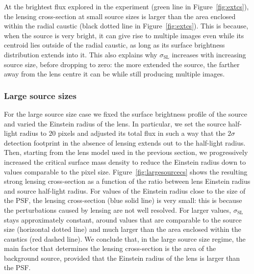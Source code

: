 \documentclass{aa}
\def\crosssect{\sigma_\mathrm{{SL}}}
\def\Fref#1{Figure~\ref{#1}\xspace}
\begin{document}
At the brightest flux explored in the experiment (green line in \Fref{fig:extcs}), the lensing cross-section at small source sizes is larger than the area enclosed within the radial caustic (black dotted line in \Fref{fig:extcs}).
This is because, when the source is very bright, it can give rise to multiple images even while its centroid lies outside of the radial caustic, as long as its surface brightness distribution extends into it.
This also explains why $\crosssect$ increases with increasing source size, before dropping to zero: the more extended the source, the farther away from the lens centre it can be while still producing multiple images.

\subsubsection{Large source sizes}

For the large source size case we fixed the surface brightness profile of the source and varied the Einstein radius of the lens.
In particular, we set the source half-light radius to $20$ pixels and adjusted its total flux in such a way that the $2\sigma$ detection footprint in the absence of lensing extends out to the half-light radius.
Then, starting from the lens model used in the previous section, we progressively increased the critical surface mass density to reduce the Einstein radius down to values comparable to the pixel size.
\Fref{fig:largesourcecs} shows the resulting strong lensing cross-section as a function of the ratio between lens Einstein radius and source half-light radius.
For values of the Einstein radius close to the size of the PSF, the lensing cross-section (blue solid line) is very small: this is because the perturbations caused by lensing are not well resolved.
For larger values, $\crosssect$ stays approximately constant, around values that are comparable to the source size (horizontal dotted line) and much larger than the area enclosed within the caustics (red dashed line).
We conclude that, in the large source size regime, the main factor that determines the lensing cross-section is the area of the background source, provided that the Einstein radius of the lens is larger than the PSF.
\end{document}
